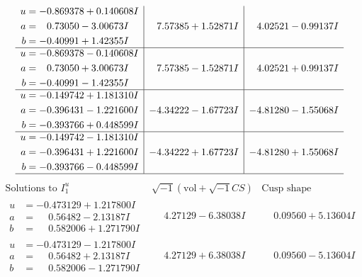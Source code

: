 \documentclass[1p]{elsarticle_modified}
\theoremstyle{definition}
\newcommand{\I}{\sqrt{-1}}
\begin{document}
$$\begin{array}{c|c|c}
\begin{aligned}
u &= -0.869378 + 0.140608 I \\
a &= \phantom{-}0.73050 - 3.00673 I \\
b &= -0.40991 + 1.42355 I\end{aligned}
 & \phantom{-}7.57385 + 1.52871 I & \phantom{-}4.02521 - 0.99137 I \\ \hline\begin{aligned}
u &= -0.869378 - 0.140608 I \\
a &= \phantom{-}0.73050 + 3.00673 I \\
b &= -0.40991 - 1.42355 I\end{aligned}
 & \phantom{-}7.57385 - 1.52871 I & \phantom{-}4.02521 + 0.99137 I \\ \hline\begin{aligned}
u &= -0.149742 + 1.181310 I \\
a &= -0.396431 - 1.221600 I \\
b &= -0.393766 + 0.448599 I\end{aligned}
 & -4.34222 - 1.67723 I & -4.81280 - 1.55068 I \\ \hline\begin{aligned}
u &= -0.149742 - 1.181310 I \\
a &= -0.396431 + 1.221600 I \\
b &= -0.393766 - 0.448599 I\end{aligned}
 & -4.34222 + 1.67723 I & -4.81280 + 1.55068 I\\
 \hline 
 \end{array}$$\newpage$$\begin{array}{c|c|c}  
\text{Solutions to }I^u_{1}& \I (\text{vol} + \sqrt{-1}CS) & \text{Cusp shape}\\
 \hline 
\begin{aligned}
u &= -0.473129 + 1.217800 I \\
a &= \phantom{-}0.56482 - 2.13187 I \\
b &= \phantom{-}0.582006 + 1.271790 I\end{aligned}
 & \phantom{-}4.27129 - 6.38038 I & \phantom{-}0.09560 + 5.13604 I \\ \hline\begin{aligned}
u &= -0.473129 - 1.217800 I \\
a &= \phantom{-}0.56482 + 2.13187 I \\
b &= \phantom{-}0.582006 - 1.271790 I\end{aligned}
 & \phantom{-}4.27129 + 6.38038 I & \phantom{-}0.09560 - 5.13604 I \\ \hline\begin{aligned}

\end{aligned}
\end{array}$$
\end{document}
